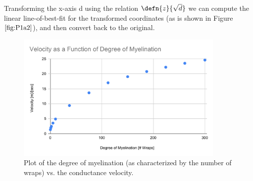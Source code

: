 \documentclass[12pt]{article}
\begin{document}
\par Transforming the x-axis d using the relation $\defn{z}{\sqrt{d}}$ we can compute the linear line-of-best-fit for the transformed coordinates (as is shown in Figure $\ref{fig:P1a2}$), and then convert back to the original.



%


 







\begin{figure}[H]
\centering
\includegraphics[width=0.9\textwidth]{Results/2a}
\caption{\label{fig:P2} Plot of the degree of myelination (as characterized by the number of wraps) vs. the conductance velocity.}
\end{figure}
\end{document}
